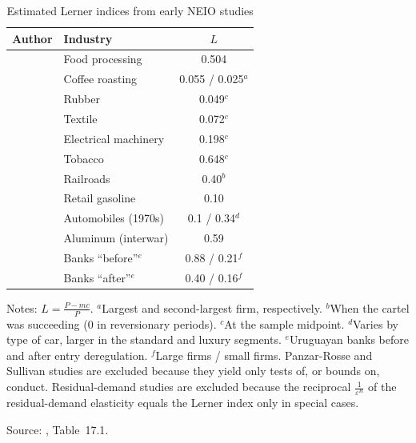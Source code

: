 \begin{table}[htbp]
\centering
\begin{threeparttable}
\caption{Estimated Lerner indices from early NEIO studies}
\label{tab:01-bresnahan-table}
\small
\begin{tabular}{@{}llc@{}}
\toprule
Author & Industry & $L$ \\
\midrule
\citet{Lopez1984} & Food processing & 0.504 \\
\citet{Roberts1984} & Coffee roasting & 0.055 / 0.025$^{a}$ \\
\citet{Appelbaum1982} & Rubber & 0.049$^{c}$ \\
\citet{Appelbaum1982} & Textile & 0.072$^{c}$ \\
\citet{Appelbaum1982} & Electrical machinery & 0.198$^{c}$ \\
\citet{Appelbaum1982} & Tobacco & 0.648$^{c}$ \\
\citet{Porter1983} & Railroads & 0.40$^{b}$ \\
\citet{Slade1987} & Retail gasoline & 0.10 \\
\citet{Bresnahan1981} & Automobiles (1970s) & 0.1 / 0.34$^{d}$ \\
\citet{Suslow1986} & Aluminum (interwar) & 0.59 \\
\citet{SpillerFavaro1984} & Banks ``before''$^{e}$ & 0.88 / 0.21$^{f}$ \\
\citet{SpillerFavaro1984} & Banks ``after''$^{e}$ & 0.40 / 0.16$^{f}$ \\
\bottomrule
\end{tabular}
\begin{tablenotes}\footnotesize
\item Notes: $L = \frac{P - mc}{P}$. $^{a}$Largest and second-largest firm, respectively. $^{b}$When the cartel was
succeeding (0 in reversionary periods). $^{c}$At the sample midpoint. $^{d}$Varies by type of car, larger in the standard
and luxury segments. $^{e}$Uruguayan banks before and after entry deregulation. $^{f}$Large firms / small firms.
Panzar-Rosse and Sullivan studies are excluded because they yield only tests of, or bounds on, conduct.
Residual-demand studies are excluded because the reciprocal $\frac{1}{\varepsilon^{R}}$ of the residual-demand elasticity
equals the Lerner index only in special cases.
\item Source: \citet{Bresnahan1989}, Table~17.1.
\end{tablenotes}
\end{threeparttable}
\end{table}

